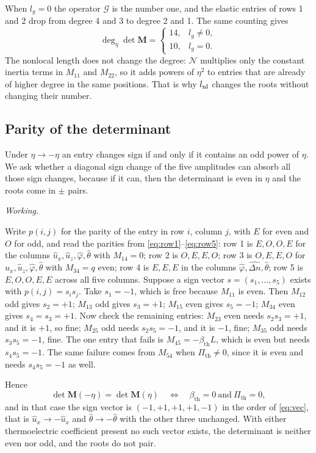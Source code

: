 \documentclass[11pt,a4paper]{article}
\newif\ifshowworked \showworkedtrue
\newenvironment{worked}{\ifshowworked\par\smallskip\noindent\textit{Working.}\par\else\setbox0\vbox\bgroup\fi}{\ifshowworked\par\smallskip\else\egroup\fi}
\newcommand{\Nc}{\mathcal{N}}
\newcommand{\Gc}{\mathcal{G}}
\newcommand{\bth}{\beta_{\mathrm{th}}}
\newcommand{\Pth}{\Pi_{\mathrm{th}}}
\newcommand{\bx}{\hat u_x}
\newcommand{\bz}{\hat u_z}
\newcommand{\bp}{\hat\varphi}
\newcommand{\bn}{\widehat{\Delta n}}
\newcommand{\bt}{\hat\theta}
\begin{document}
\noindent When $l_g=0$ the operator $\Gc$ is the number one, and the elastic entries of rows 1 and 2 drop
from degree 4 and 3 to degree 2 and 1. The same counting gives
\begin{equation}\label{eq:deg}
\deg_\eta\det\mathbf M=
\begin{cases}
14, & l_g\ne0,\\
10, & l_g=0 .
\end{cases}
\end{equation}
The nonlocal length does not change the degree: $\Nc$ multiplies only the constant inertia terms in
$M_{11}$ and $M_{22}$, so it adds powers of $\eta^2$ to entries that are already of higher degree in the
same positions. That is why $l_{\rm nl}$ changes the roots without changing their number.

\subsection{Parity of the determinant}

Under $\eta\to-\eta$ an entry changes sign if and only if it contains an odd power of $\eta$. We ask whether
a diagonal sign change of the five amplitudes can absorb all those sign changes, because if it can, then
the determinant is even in $\eta$ and the roots come in $\pm$ pairs.

\begin{worked}
Write $p(i,j)$ for the parity of the entry in row $i$, column $j$, with $E$ for even and $O$ for odd, and
read the parities from \eqref{eq:row1}--\eqref{eq:row5}:
row 1 is $E,O,O,E$ for the columns $\bx,\bz,\bp,\bt$ with $M_{14}=0$; row 2 is $O,E,E,O$; row 3 is $O,E,E,O$
for $\bx,\bz,\bp,\bt$ with $M_{34}=q$ even; row 4 is $E,E,E$ in the columns $\bp,\bn,\bt$; row 5 is
$E,O,O,E,E$ across all five columns.
Suppose a sign vector $s=(s_1,\dots,s_5)$ exists with $p(i,j)=s_is_j$. Take $s_1=-1$, which is free because
$M_{11}$ is even. Then $M_{12}$ odd gives $s_2=+1$; $M_{13}$ odd gives $s_3=+1$; $M_{15}$ even gives
$s_5=-1$; $M_{34}$ even gives $s_4=s_3=+1$. Now check the remaining entries: $M_{23}$ even needs
$s_2s_3=+1$, and it is $+1$, so fine; $M_{25}$ odd needs $s_2s_5=-1$, and it is $-1$, fine; $M_{35}$ odd
needs $s_3s_5=-1$, fine. The one entry that fails is $M_{45}=-\bth L$, which is even but needs
$s_4s_5=-1$. The same failure comes from $M_{54}$ when $\Pth\ne0$, since it is even and needs $s_4s_5=-1$ as
well.
\end{worked}

\noindent Hence
\begin{equation}\label{eq:parity}
\det\mathbf M(-\eta)=\det\mathbf M(\eta)
\quad\Longleftrightarrow\quad
\bth=0\ \text{and}\ \Pth=0 ,
\end{equation}
and in that case the sign vector is $(-1,+1,+1,+1,-1)$ in the order of \eqref{eq:vec}, that is
$\bx\to-\bx$ and $\bt\to-\bt$ with the other three unchanged. With either thermoelectric coefficient present
no such vector exists, the determinant is neither even nor odd, and the roots do not pair.
\end{document}
